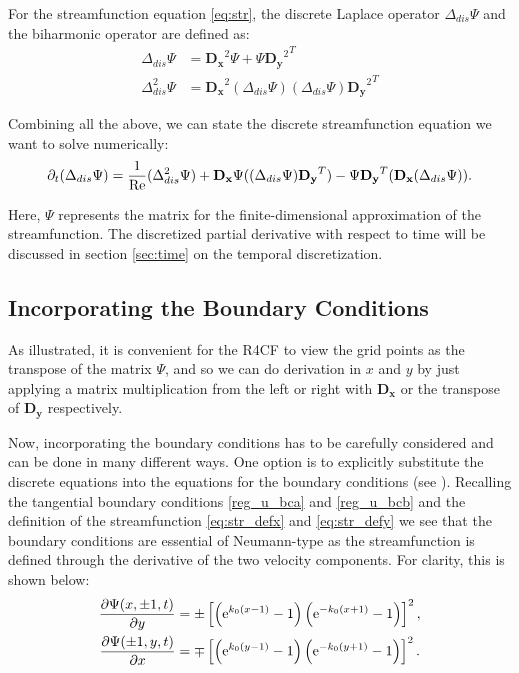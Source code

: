 For the streamfunction equation \eqref{eq:str}, the discrete Laplace operator
$\Delta_{dis} \Psi$ and the biharmonic operator are defined as:
\begin{align}
  \Delta_{dis} \Psi &= \mathbf{D_x}^2\Psi + \Psi{\mathbf{D_y}^2}^T \\
  \Delta_{dis}^2 \Psi &= \mathbf{D_x}^2(\Delta_{dis} \Psi) (\Delta_{dis}
    \Psi){\mathbf{D_y}^2}^T 
\end{align}

Combining all the above, we can state the discrete streamfunction equation we
want to solve numerically:
\vspace{-5pt}
\begin{align}
\partial_t (\Delta_{dis} \Psi) = \frac{1}{\mathrm{Re}} (\Delta_{dis}^2 \Psi)
  + \mathbf{D_x}\Psi((\Delta_{dis}\Psi)\mathbf{D_y}^T)
  - \Psi\mathbf{D_y}^T (\mathbf{D_x}(\Delta_{dis} \Psi)). 
\label{eq:str_dis}
\end{align}

Here, $\Psi$ represents the matrix for the finite-dimensional approximation of
the streamfunction. The discretized partial derivative with respect to time
will be discussed in section \ref{sec:time} on the temporal discretization.

\subsection{Incorporating the Boundary Conditions} \label{sec:bc}

As illustrated, it is convenient for the R4CF to view the grid points as the
transpose of the matrix $\Psi$, and so we can do derivation in $x$ and $y$ by
just applying a matrix multiplication from the left or right with
$\mathbf{D_x}$ or the transpose of $\mathbf{D_y}$ respectively. 

Now, incorporating the boundary conditions has to be carefully considered and
can be done in many different ways. One option is to explicitly substitute the
discrete equations into the equations for the boundary conditions (see
\cite{meseguer2020}). Recalling the tangential boundary conditions
\eqref{reg_u_bca} and \eqref{reg_u_bcb} and the definition of the
streamfunction \eqref{eq:str_defx} and \eqref{eq:str_defy} we see that the
boundary conditions are essential of Neumann-type as the streamfunction is
defined through the derivative of the two velocity components. For clarity,
this is shown below:
\begin{align}
\frac{\partial\Psi(x,\pm 1,t)}{\partial y} &= \pm\left[\left(\mathrm{e}^{k_0(x - 1)} - 1\right)
  \left(\mathrm{e}^{-k_0(x + 1)} - 1\right)\right]^2,\label{reg_psi_bca} \\
  \frac{\partial\Psi(\pm 1,y,t)}{\partial x} &= \mp\left[\left(\mathrm{e}^{k_0(y - 1)} - 1\right)
  \left(\mathrm{e}^{-k_0(y + 1)} - 1\right)\right]^2.\label{reg_psi_bcb}
\end{align}

